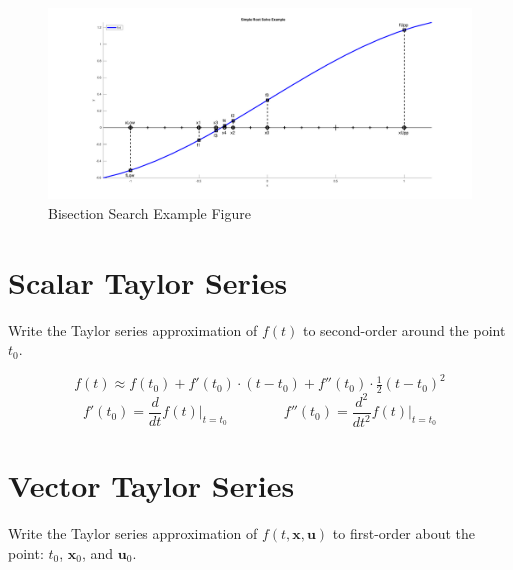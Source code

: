 \begin{figure}[ht]
	\centering
  \includegraphics[width=\textwidth]{bisectionSearchFigure.pdf}
  \caption{Bisection Search Example Figure}
  \label{fig:RootSolveExampleFigure}
\end{figure}




\pagebreak
\section{Scalar Taylor Series}

Write the Taylor series approximation of $f(t)$ to second-order around the point $t_0$.

\vspace{1em}
\begin{equation*}
  f(t) \approx f(t_0) + f'(t_0) \cdot (t - t_0) + f''(t_0) \cdot \tfrac{1}{2} (t - t_0)^2
\end{equation*}
\vspace{1em}
\begin{equation*}
  f'(t_0) = \frac{d}{dt} f(t) \big|_{t = t_0}
  \quad \quad \quad \quad
  f''(t_0) = \frac{d^2}{dt^2} f(t) \big|_{t = t_0}
\end{equation*}
\vspace{1em}

\section{Vector Taylor Series}

Write the Taylor series approximation of $f(t, \bm{x}, \bm{u})$ to first-order
about the point: $t_0$, $\bm{x}_0$, and $\bm{u}_0$.

